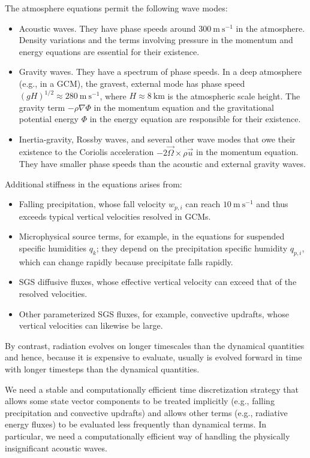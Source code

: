 \documentclass{report}
\begin{document}
The atmosphere equations permit the following wave modes:
\begin{itemize}
    \item Acoustic waves. They have phase speeds around $300~\mathrm{m~s^{-1}}$ in the atmosphere. Density variations and the terms involving pressure in the momentum and energy equations are essential for their existence.
    \item Gravity waves. They have a spectrum of phase speeds. In a deep atmosphere (e.g., in a GCM), the gravest, external mode has phase speed $(gH)^{1/2} \approx 280~\mathrm{m~s^{-1}}$, where $H\approx 8~\mathrm{km}$ is the atmospheric scale height. The gravity term $-\rho \nabla \Phi$ in the momentum equation and the gravitational potential energy $\Phi$ in the energy equation are responsible for their existence.
    \item Inertia-gravity, Rossby waves, and several other wave modes that owe their existence to the Coriolis acceleration $-2\vec{\Omega} \times \rho \vec{u}$ in the momentum equation. They have smaller phase speeds than the acoustic and external gravity waves.
\end{itemize}
Additional stiffness in the equations arises from:
\begin{itemize}
    \item Falling precipitation, whose fall velocity $w_{p,i}$ can reach $10~\mathrm{m~s^{-1}}$ and thus exceeds typical vertical velocities resolved in GCMs.
    \item Microphysical source terms, for example, in the equations for suspended specific humidities $q_k$; they depend on the precipitation specific humidity $q_{p,i}$, which can change rapidly because precipitate falls rapidly. 
    \item SGS diffusive fluxes, whose effective vertical velocity can exceed that of the resolved velocities.
    \item Other parameterized SGS fluxes, for example, convective updrafts, whose vertical velocities can likewise be large.
\end{itemize}
By contrast, radiation evolves on longer timescales than the dynamical quantities and hence, because it is expensive to evaluate, usually is evolved forward in time with longer timesteps than the dynamical quantities. 

We need a stable and computationally efficient time discretization strategy that allows some state vector components to be treated implicitly (e.g., falling precipitation and convective updrafts) and allows other terms (e.g., radiative energy fluxes) to be evaluated less frequently than dynamical terms. In particular, we need a computationally efficient way of handling the physically insignificant acoustic waves.
     
\end{document}
